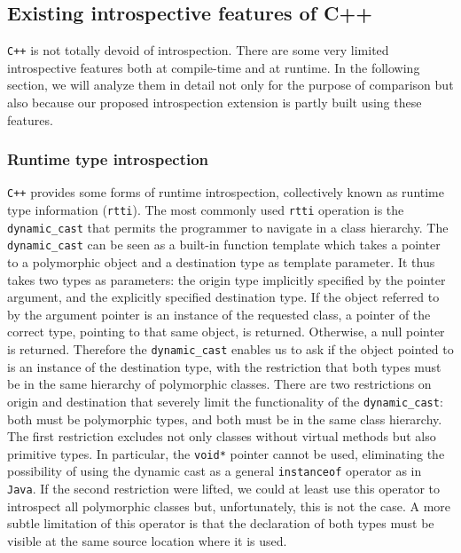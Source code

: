 \subsection{Existing introspective features of C++}

\texttt{C++} is not totally devoid of introspection. There are some very limited introspective features both at compile-time and
at runtime. In the following section, we will analyze them in detail not only for the purpose of comparison but also because
our proposed introspection extension is partly built using these features.

\subsubsection{Runtime type introspection}

\texttt{C++} provides some forms of runtime introspection, collectively known as runtime type information (\texttt{rtti}). The most commonly
used \texttt{rtti} operation is the \texttt{dynamic\_cast} that permits the programmer to navigate in a class hierarchy.
The \texttt{dynamic\_cast} can be seen as a built-in function template which takes a pointer to a polymorphic object and a destination type
as template parameter. It thus takes two types as parameters: the origin type implicitly specified by the pointer argument, and the
explicitly specified destination type. If the object referred to by the argument pointer is an instance of the requested class, a pointer of
the correct type, pointing to that same object, is returned. Otherwise, a null pointer is returned. Therefore the \texttt{dynamic\_cast}
enables us to ask if the object pointed to is an instance of the destination type, with the restriction that both types must be in the same
hierarchy of polymorphic classes. There are two restrictions on origin and destination that severely limit the functionality of the
\texttt{dynamic\_cast}: both must be polymorphic types, and both must be in the same class hierarchy. The first restriction excludes not
only classes without virtual methods but also primitive types. In particular, the \texttt{void*} pointer cannot be used, eliminating
the possibility of using the dynamic cast as a general \texttt{instanceof} operator as in \texttt{Java}. If the second restriction were lifted,
we could at least use this operator to introspect all polymorphic classes but, unfortunately, this is not the case. A more subtle limitation
of this operator is that the declaration of both types must be visible at the same source location where it is used.

